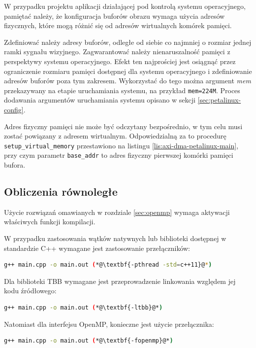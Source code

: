 W przypadku projektu aplikacji działającej pod kontrolą systemu operacyjnego, pamiętać należy, że konfiguracja buforów obrazu wymaga użycia adresów fizycznych, które mogą różnić się od adresów wirtualnych komórek pamięci.

Zdefiniować należy adresy buforów, odległe od siebie co najmniej o rozmiar jednej ramki sygnału wizyjnego. Zagwarantować należy nienaruszalność pamięci z perspektywy systemu operacyjnego. Efekt ten najprościej jest osiągnąć przez ograniczenie rozmiaru pamięci dostępnej dla systemu operacyjnego i zdefiniowanie adresów buforów poza tym zakresem. Wykorzystać do tego można argument \textit{mem} przekazywany na etapie uruchamiania systemu, na przykład \texttt{mem=224M}. Proces dodawania argumentów uruchamiania systemu opisano w sekcji \ref{sec:petalinux-config}.

Adres fizyczny pamięci nie może być odczytany bezpośrednio, w tym celu musi zostać powiązany z adresem wirtualnym. Odpowiedzialną za to procedurę \texttt{setup\_virtual\_memory} przestawiono na listingu \ref{lis:axi-dma-petalinux-main}, przy czym parametr \texttt{base\_addr} to adres fizyczny pierwszej komórki pamięci bufora. 

\subsection{Obliczenia równoległe}

\label{sec:multithreading-config}
Użycie rozwiązań omawianych w rozdziale \ref{sec:openmp} wymaga aktywacji właściwych funkcji kompilacji.

W przypadku zastosowania wątków natywnych lub biblioteki dostępnej w standardzie C++ wymagane jest zastosowanie przełączników:

\begin{lstlisting}[language=bash]
g++ main.cpp -o main.out (*@\textbf{-pthread -std=c++11}@*)
\end{lstlisting}

Dla biblioteki TBB wymagane jest przeprowadzenie linkowania względem jej kodu źródłowego:

\begin{lstlisting}[language=bash]
g++ main.cpp -o main.out (*@\textbf{-ltbb}@*)
\end{lstlisting}

Natomiast dla interfejsu OpenMP, konieczne jest użycie przełącznika:

\begin{lstlisting}[language=bash]
g++ main.cpp -o main.out (*@\textbf{-fopenmp}@*)
\end{lstlisting}


